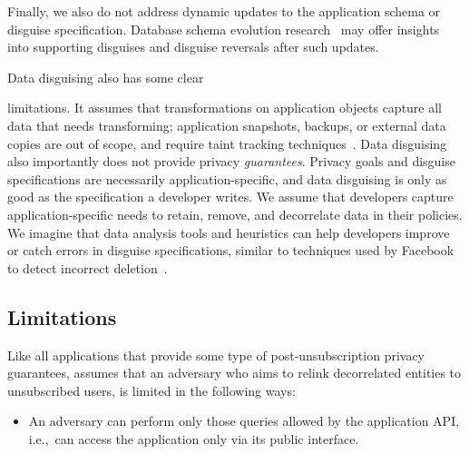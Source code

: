 Finally, we also do not address dynamic updates to the application schema or disguise specification.
%
Database schema evolution research~\cite{schema:evo} may offer insights
into supporting disguises and disguise reversals after such updates.

Data disguising also has some clear {limitations.
It assumes that transformations on application objects capture all data that needs transforming;
application snapshots, backups, or external data copies are out of scope, and require
\eg taint tracking techniques~\cite{schengendb}.
Data disguising also importantly does not provide privacy \emph{guarantees}.
%
Privacy goals and disguise specifications are necessarily application-specific, and
data disguising is only as good as the specification a developer writes. We assume
that developers capture application-specific needs to retain, remove, and decorrelate data in
their policies.
We imagine that data analysis tools and heuristics can help developers improve or catch
errors in disguise specifications, similar to techniques used by Facebook to detect incorrect
deletion~\cite{delf}.
%
%




\iffalse
\subsection{Limitations}
%
%
%
Like all applications that provide some type of post-unsubscription privacy guarantees, \name assumes
that an adversary who aims to relink decorrelated entities to unsubscribed users, is limited in the
following ways:
\begin{itemize}
    \item An adversary can perform only those queries allowed by the application API,
i.e.,\ can access the application only via its public interface.


\end{itemize}}
